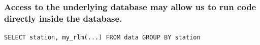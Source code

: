 \documentclass{beamer}
\begin{document}
\begin{frame}[fragile]

    \frametitle{Access to the underlying database may allow us to run code directly inside the
    database.}

\begin{verbatim}
SELECT station, my_rlm(...) FROM data GROUP BY station
\end{verbatim}


%
%

\end{frame}
\end{document}

